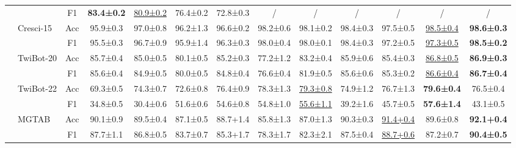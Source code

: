 \documentclass[10pt,twocolumn,letterpaper]{article}
\begin{document}
\begin{table*}[htbp]
{\begin{tabular}{|c|l|c|c|c|c|c|c|c|c|c|c|c|}
\cline{3-13}
&   & F1  & \textbf{83.4±0.2} & \underline{80.9±0.2} & 76.4±0.2 & 72.8±0.3 & /  & /  & /  & / & /  & /\\
\cline{2-13}
& \multirow{2}{*}{Cresci-15} & Acc   & 95.9±0.3 & 97.0±0.8 & 96.2±1.3 & 96.6±0.2 & 98.2±0.6 & 98.1±0.2 & 98.4±0.3 & 97.5±0.5 & \underline{98.5±0.4} & \textbf{98.6±0.3} \\
\cline{3-13}
&    & F1 & 95.5±0.3 & 96.7±0.9 & 95.9±1.4 & 96.3±0.3 & 98.0±0.4 & 98.0±0.1 & 98.4±0.3 & 97.2±0.5 & \underline{97.3±0.5} & \textbf{98.5±0.2}\\
\cline{2-13}
& \multirow{2}{*}{TwiBot-20} & Acc   & 85.7±0.4 & 85.0±0.5 & 80.1±0.5 & 85.2±0.3 & 77.2±1.2 & 83.2±0.4 & 85.9±0.6 & 85.4±0.3 & \underline{86.8±0.5} & \textbf{86.9±0.3} \\
\cline{3-13}
&    & F1 & 85.6±0.4 & 84.9±0.5 & 80.0±0.5 & 84.8±0.4 & 76.6±0.4 & 81.9±0.5 & 85.6±0.6 & 85.3±0.2 & \underline{86.6±0.4} & \textbf{86.7±0.4} \\
\cline{2-13}
& \multirow{2}{*}{TwiBot-22} & Acc   & 69.3±0.5 & 74.3±0.7 & 72.6±0.8 & 76.4±0.9 & 78.3±1.3 & \underline{79.3±0.8} & 74.9±1.2 & 76.7±1.3 & \textbf{79.6±0.4} & 76.5±0.4 \\
\cline{3-13}
&   & F1 & 34.8±0.5 & 30.4±0.6 & 51.6±0.6 & 54.6±0.8 & 54.8±1.0 & \underline{55.6±1.1} & 39.2±1.6 & 45.7±0.5 & \textbf{57.6±1.4} & 43.1±0.5\\
\cline{2-13}
& \multirow{2}{*}{MGTAB} & Acc   & 90.1±0.9 & 89.5±0.4 & 87.1±0.5 & 88.7+1.4 & 85.8±1.3 & 87.0±1.3 & 90.3±0.3 & \underline{91.4+0.4} & 89.6±0.8 & \textbf{92.1+0.4}\\
\cline{3-13}
&   & F1 & 87.7±1.1 & 86.8±0.5 & 83.7±0.7 & 85.3+1.7 & 78.3±1.7 & 82.3±2.1 & 87.5±0.4 & \underline{88.7+0.6} & 87.2±0.7 & \textbf{90.4±0.5} \\
\hline
\end{tabular}}
  \label{tab:6}\end{table*}
\end{document}
